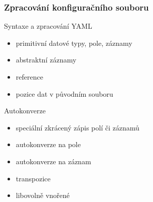 \begin{frame}[fragile]
	\frametitle{Zpracování konfiguračního souboru}
	\begin{minipage}[t]{0.45\textwidth}
	\begin{block}{Syntaxe a zpracování YAML}
	\begin{itemize}
		\item<3> primitivní datové typy, pole, záznamy
		\item<4> abstraktní záznamy
		\item<5> reference
		\item<6> pozice dat v původním souboru
	\end{itemize}
	\end{block}
	\end{minipage}
	\hspace{5pt}
	\begin{minipage}[t]{0.45\textwidth}
	\begin{block}{Autokonverze\vphantom{y}}
	\begin{itemize}
		\item<7> speciální zkrácený zápis polí či záznamů
		\item<8> autokonverze na pole
		\item<9> autokonverze na záznam
		\item<10> transpozice
		\item<11> libovolně vnořené
	\end{itemize}
	\end{block}
	\end{minipage}
\end{frame}

